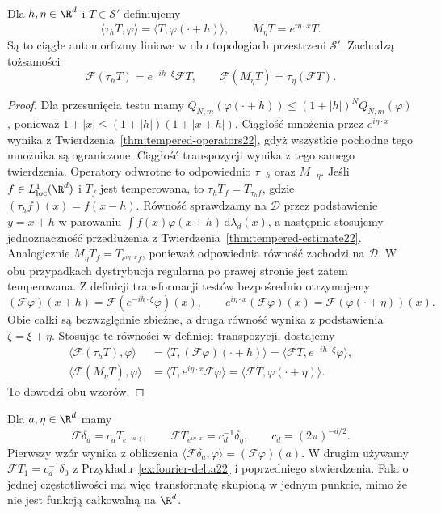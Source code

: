 \begin{stwierdzenie}
\label{prop:dt-tempered-fourier-shift-modulation}
Dla $h,\eta\in\R^d$ i $T\in\mathcal S'$ definiujemy
\[
 \langle\tau_h T,\varphi\rangle
 =\langle T,\varphi(\cdot+h)\rangle,\qquad
 M_\eta T=e^{i\eta\cdot x}T.
\]
Są to ciągłe automorfizmy liniowe w obu topologiach
przestrzeni $\mathcal S'$. Zachodzą tożsamości
\[
 \mathcal F(\tau_h T)=e^{-ih\cdot\xi}\mathcal FT,
 \qquad \mathcal F(M_\eta T)=\tau_\eta(\mathcal FT).
\]
\end{stwierdzenie}
\begin{proof}
Dla przesunięcia testu mamy
$Q_{N,m}(\varphi(\cdot+h))\le
(1+|h|)^NQ_{N,m}(\varphi)$, ponieważ
$1+|x|\le(1+|h|)(1+|x+h|)$.
Ciągłość mnożenia przez $e^{i\eta\cdot x}$ wynika z
Twierdzenia~\ref{thm:tempered-operators22}, gdyż wszystkie
pochodne tego mnożnika są ograniczone. Ciągłość transpozycji
wynika z tego samego twierdzenia. Operatory odwrotne to
odpowiednio $\tau_{-h}$ oraz $M_{-\eta}$.
Jeśli $f\in L^1_{\mathrm{loc}}(\R^d)$ i $T_f$ jest
temperowana, to $\tau_h T_f=T_{\tau_h f}$, gdzie
$(\tau_h f)(x)=f(x-h)$. Równość sprawdzamy na
$\mathcal D$ przez podstawienie $y=x+h$ w parowaniu
$\int f(x)\varphi(x+h)\,\mathrm d\lambda_d(x)$,
a następnie stosujemy jednoznaczność przedłużenia
z Twierdzenia~\ref{thm:tempered-estimate22}.
Analogicznie $M_\eta T_f=T_{e^{i\eta\cdot x}f}$,
ponieważ odpowiednia równość zachodzi na $\mathcal D$.
W obu przypadkach dystrybucja regularna po prawej
stronie jest zatem temperowana.
Z definicji transformacji testów bezpośrednio otrzymujemy
\[
 (\mathcal F\varphi)(x+h)
 =\mathcal F(e^{-ih\cdot\xi}\varphi)(x),
 \qquad
 e^{i\eta\cdot x}(\mathcal F\varphi)(x)
 =\mathcal F(\varphi(\cdot+\eta))(x).
\]
Obie całki są bezwzględnie zbieżne, a druga równość
wynika z podstawienia $\zeta=\xi+\eta$.
Stosując te równości w definicji transpozycji, dostajemy
\[
\begin{aligned}
 \langle\mathcal F(\tau_hT),\varphi\rangle
 &=\langle T,(\mathcal F\varphi)(\cdot+h)\rangle
 =\langle\mathcal FT,e^{-ih\cdot\xi}\varphi\rangle,\\
 \langle\mathcal F(M_\eta T),\varphi\rangle
 &=\langle T,e^{i\eta\cdot x}\mathcal F\varphi\rangle
 =\langle\mathcal FT,\varphi(\cdot+\eta)\rangle .
\end{aligned}
\]
To dowodzi obu wzorów.
\end{proof}

\begin{przyklad}
Dla $a,\eta\in\R^d$ mamy
\[
 \mathcal F\delta_a=c_d T_{e^{-ia\cdot\xi}},
 \qquad
 \mathcal F T_{e^{i\eta\cdot x}}=c_d^{-1}\delta_\eta,
 \qquad c_d=(2\pi)^{-d/2}.
\]
Pierwszy wzór wynika z obliczenia
$\langle\mathcal F\delta_a,\varphi\rangle
=(\mathcal F\varphi)(a)$.
W drugim używamy $\mathcal F T_1=c_d^{-1}\delta_0$
z Przykładu~\ref{ex:fourier-delta22} i poprzedniego
stwierdzenia. Fala o jednej częstotliwości ma więc
transformatę skupioną w jednym punkcie, mimo że nie
jest funkcją całkowalną na $\R^d$.
\end{przyklad}

